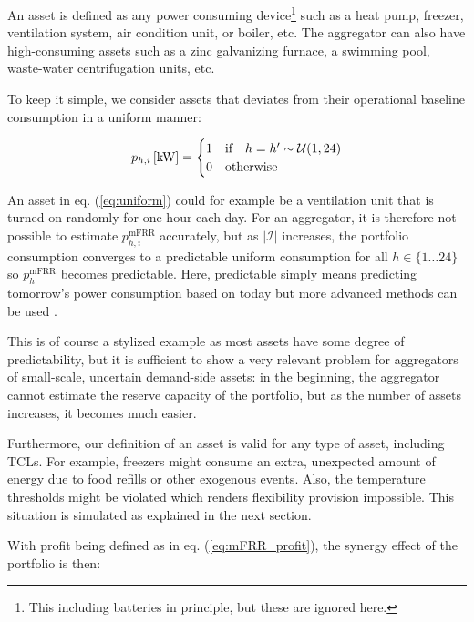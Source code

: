 \documentclass[lettersize,journal]{IEEEtran}
\begin{document}
An asset is defined as any power consuming device\footnote{This including batteries in principle, but these are ignored here.} such as a heat pump, freezer, ventilation system, air condition unit, or boiler, etc. The aggregator can also have high-consuming assets such as a zinc galvanizing furnace, a swimming pool, waste-water centrifugation units, etc.

To keep it simple, we consider assets that deviates from their operational baseline consumption in a uniform manner:

\begin{align}\label{eq:uniform}
    p_{h,i} \thinspace [\text{kW}] = \begin{cases}
                                         1 & \text{if} \quad h = h^{\prime} \sim \mathcal{U}(1,24) \\
                                         0 & \text{otherwise}
                                     \end{cases}
\end{align}

An asset in eq. (\ref{eq:uniform}) could for example be a ventilation unit that is turned on randomly for one hour each day. For an aggregator, it is therefore not possible to estimate $p^{\text{mFRR}}_{h, i}$ accurately, but as $|\mathcal{I}|$ increases, the portfolio consumption converges to a predictable uniform consumption for all $h \in \{1 \hdots 24 \}$ so $p^{\text{mFRR}}_{h}$ becomes predictable. Here, predictable simply means predicting tomorrow's power consumption based on today but more advanced methods can be used \cite{ziras2021baselines}.


This is of course a stylized example as most assets have some degree of predictability, but it is sufficient to show a very relevant problem for aggregators of small-scale, uncertain demand-side assets: in the beginning, the aggregator cannot estimate the reserve capacity of the portfolio, but as the number of assets increases, it becomes much easier.

Furthermore, our definition of an asset is valid for any type of asset, including TCLs. For example, freezers might consume an extra, unexpected amount of energy due to food refills or other exogenous events. Also, the temperature thresholds might be violated which renders flexibility provision impossible. This situation is simulated as explained in the next section.

With profit being defined as in eq. (\ref{eq:mFRR_profit}), the synergy effect of the portfolio is then:
\end{document}
